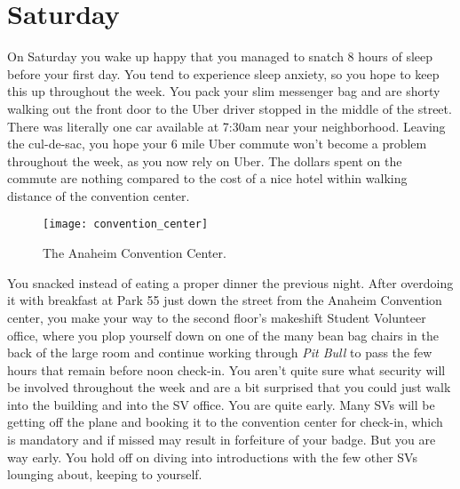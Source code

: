 \documentclass[../main.tex]{subfiles}
\begin{document}
\section{Saturday}

On Saturday you wake up happy that you managed to snatch 8 hours of sleep before your first day. You tend to experience sleep anxiety, so you hope to keep this up throughout the week. You pack your slim messenger bag and are shorty walking out the front door to the Uber driver stopped in the middle of the street. There was literally one car available at 7:30am near your neighborhood. Leaving the cul-de-sac, you hope your 6 mile Uber commute won't become a problem throughout the week, as you now rely on Uber. The dollars spent on the commute are nothing compared to the cost of a nice hotel within walking distance of the convention center.

\begin{figure}[h]
	\centering
	\texttt{[image: convention\_center]}
	\caption*{The Anaheim Convention Center.}
\end{figure}

You snacked instead of eating a proper dinner the previous night. After overdoing it with breakfast at Park 55 just down the street from the Anaheim Convention center, you make your way to the second floor's makeshift Student Volunteer office, where you plop yourself down on one of the many bean bag chairs in the back of the large room and continue working through \textit{Pit Bull} to pass the few hours that remain before noon check-in. You aren't quite sure what security will be involved throughout the week and are a bit surprised that you could just walk into the building and into the SV office. You are quite early. Many SVs will be getting off the plane and booking it to the convention center for check-in, which is mandatory and if missed may result in forfeiture of your badge. But you are way early. You hold off on diving into introductions with the few other SVs lounging about, keeping to yourself.
\end{document}
